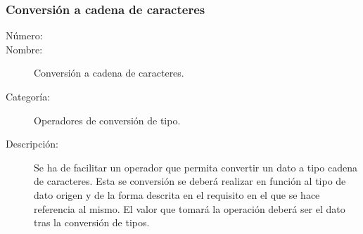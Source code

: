 \subsubsection{Conversión a cadena de caracteres}
\begin{framed}
	\begin{description}
		\item [Número:] \cn
		\item [Nombre:] Conversión a cadena de caracteres.
		\item [Categoría:] Operadores de conversión de tipo.
		\item [Descripción:] Se ha de facilitar un operador que permita convertir un dato a tipo cadena de caracteres. Esta se conversión
		se deberá realizar en función al tipo de dato origen y de la forma descrita en el requisito en el que se hace referencia al mismo.
		El valor que tomará la operación deberá ser el dato tras la conversión de tipos.
	\end {description}
\end{framed}
